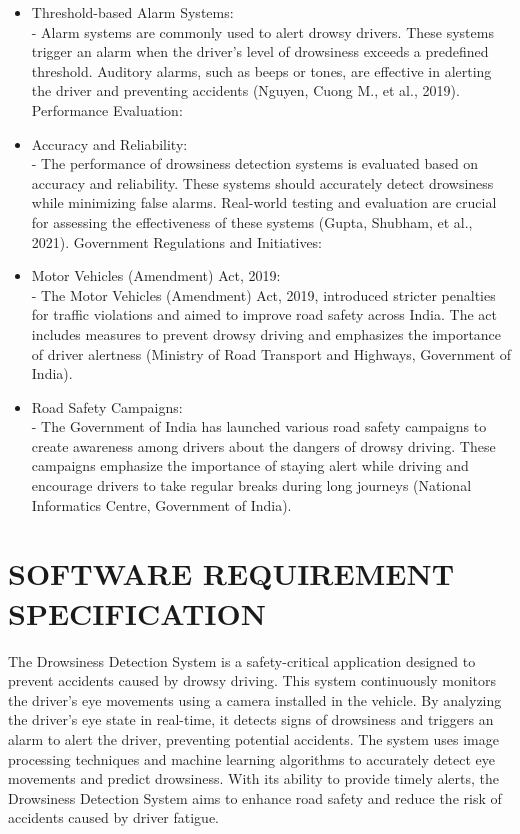 \documentclass[12pt]{article}
\begin{document}
\begin{itemize}
\item Threshold-based Alarm Systems:\\ - Alarm systems are commonly used to alert drowsy drivers. These systems trigger an alarm when the driver's level of drowsiness exceeds a predefined threshold. Auditory alarms, such as beeps or tones, are effective in alerting the driver and preventing accidents (Nguyen, Cuong M., et al., 2019).
Performance Evaluation:
\item Accuracy and Reliability: \\- The performance of drowsiness detection systems is evaluated based on accuracy and reliability. These systems should accurately detect drowsiness while minimizing false alarms. Real-world testing and evaluation are crucial for assessing the effectiveness of these systems (Gupta, Shubham, et al., 2021).
Government Regulations and Initiatives:
\item Motor Vehicles (Amendment) Act, 2019:\\
- The Motor Vehicles (Amendment) Act, 2019, introduced stricter penalties for traffic violations and aimed to improve road safety across India. The act includes measures to prevent drowsy driving and emphasizes the importance of driver alertness (Ministry of Road Transport and Highways, Government of India).
\item Road Safety Campaigns:\\
- The Government of India has launched various road safety campaigns to create awareness among drivers about the dangers of drowsy driving. These campaigns emphasize the importance of staying alert while driving and encourage drivers to take regular breaks during long journeys (National Informatics Centre, Government of India).
\end{itemize}
\newpage
\section{SOFTWARE REQUIREMENT SPECIFICATION }

The Drowsiness Detection System is a safety-critical application designed to prevent accidents caused by drowsy driving. This system continuously monitors the driver's eye movements using a camera installed in the vehicle. By analyzing the driver's eye state in real-time, it detects signs of drowsiness and triggers an alarm to alert the driver, preventing potential accidents. The system uses image processing techniques and machine learning algorithms to accurately detect eye movements and predict drowsiness. With its ability to provide timely alerts, the Drowsiness Detection System aims to enhance road safety and reduce the risk of accidents caused by driver fatigue.
\end{document}

